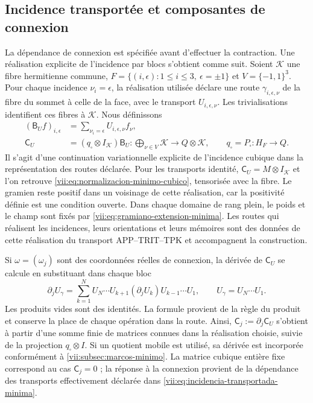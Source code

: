 \subsection{Incidence transportée et composantes de connexion}
\label{vii:subsec:incidencia-conexion-minima}

La dépendance de connexion est spécifiée avant d'effectuer la
contraction. Une réalisation explicite de l'incidence par blocs
s'obtient comme suit. Soient \(\mathcal K\) une fibre hermitienne commune,
\(F=\{(i,\epsilon):1\leq i\leq3,\ \epsilon=\pm1\}\) et
\(V=\{-1,1\}^3\). Pour chaque incidence \(\nu_i=\epsilon\),
la réalisation utilisée déclare une route \(\gamma_{i,\epsilon,\nu}\)
de la fibre du sommet à celle de la face, avec le transport
\(U_{i,\epsilon,\nu}\). Les trivialisations identifient ces fibres
à \(\mathcal K\). Nous définissons
\begin{equation}
 \begin{split}
 (\mathsf B_Uf)_{i,\epsilon}
   &=\sum_{\nu_i=\epsilon}U_{i,\epsilon,\nu}f_\nu,\\
 \mathsf C_U&=(q_\square\otimes I_{\mathcal K})\mathsf B_U:
   \bigoplus_{\nu\in V}\mathcal K\longrightarrow Q\otimes\mathcal K,
 \qquad q_\square=P_\square:H_F\to Q.
 \end{split}
 \label{vii:eq:incidencia-transportada-minima}
\end{equation}
Il s'agit d'une continuation variationnelle explicite de l'incidence cubique
dans la représentation des routes déclarée. Pour les transports identité,
\(\mathsf C_U=M\otimes I_{\mathcal K}\) et l'on retrouve
\eqref{vii:eq:normalizacion-minimo-cubico}, tensorisée avec la fibre.
Le gramien reste positif dans un voisinage de cette réalisation,
car la positivité définie est une condition ouverte. Dans chaque domaine
de rang plein, le poids et le champ sont fixés par
\eqref{vii:eq:gramiano-extension-minima}. Les routes qui réalisent les
incidences, leurs orientations et leurs mémoires sont des données de cette
réalisation du transport APP--TRIT--TPK et accompagnent la construction.

Si \(\omega=(\omega_j)\) sont des coordonnées réelles de connexion, la dérivée de \(\mathsf C_U\) se calcule en substituant dans chaque bloc
\begin{equation}
 \partial_j U_\gamma
 =\sum_{k=1}^{N}
    U_N\cdots U_{k+1}(\partial_jU_k)U_{k-1}\cdots U_1,
 \qquad U_\gamma=U_N\cdots U_1.
 \label{vii:eq:derivada-incidencia-rutas}
\end{equation}
Les produits vides sont des identités. La formule provient de la règle du produit et conserve la place de chaque opération dans la route. Ainsi, \(\mathsf C_j:=\partial_j\mathsf C_U\) s'obtient à partir d'une somme finie de matrices connues dans la réalisation choisie, suivie de la projection \(q_\square\otimes I\). Si un quotient mobile est utilisé, sa dérivée est incorporée conformément à \ref{vii:subsec:marcos-minimo}. La matrice cubique entière fixe correspond au cas \(\mathsf C_j=0\) ; la réponse à la connexion provient de la dépendance des transports effectivement déclarée dans \eqref{vii:eq:incidencia-transportada-minima}.

